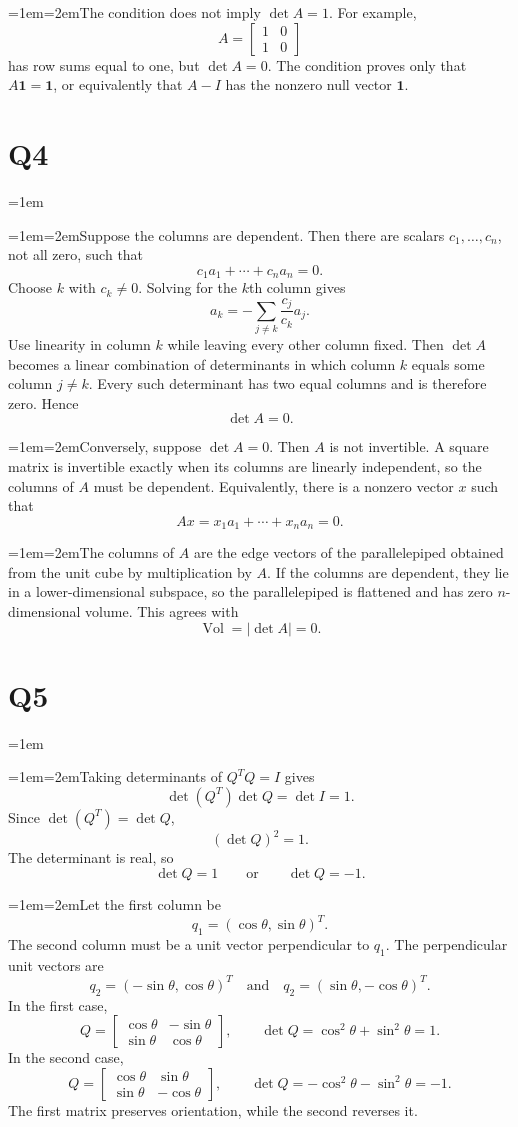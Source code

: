 \documentclass[11pt]{article}
\newcommand{\solutionquestion}[1]{\par\leftskip=0pt\section*{Q#1}\leftskip=1em}
\newcommand{\solutionpart}[1]{\par\smallskip\leftskip=1em\noindent\hangindent=2em\hangafter=1\makebox[1.5em][l]{\textbf{(#1)}}\hspace{0.5em}\ignorespaces}
\begin{document}
\solutionpart{iii}The condition does not imply $\det A=1$. For example,
\[
A=\begin{bmatrix}1&0\\1&0\end{bmatrix}
\]
has row sums equal to one, but $\det A=0$. The condition proves only that $A\boldsymbol{1}=\boldsymbol{1}$, or equivalently that $A-I$ has the nonzero null vector $\boldsymbol{1}$.

\solutionquestion{4}
\solutionpart{i}Suppose the columns are dependent. Then there are scalars $c_1,\ldots,c_n$, not all zero, such that
\[
c_1a_1+\cdots+c_n a_n=0.
\]
Choose $k$ with $c_k\ne0$. Solving for the $k$th column gives
\[
a_k=-\sum_{j\ne k}\frac{c_j}{c_k}a_j.
\]
Use linearity in column $k$ while leaving every other column fixed. Then $\det A$ becomes a linear combination of determinants in which column $k$ equals some column $j\ne k$. Every such determinant has two equal columns and is therefore zero. Hence
\[
\det A=0.
\]

\solutionpart{ii}Conversely, suppose $\det A=0$. Then $A$ is not invertible. A square matrix is invertible exactly when its columns are linearly independent, so the columns of $A$ must be dependent. Equivalently, there is a nonzero vector $x$ such that
\[
Ax=x_1a_1+\cdots+x_n a_n=0.
\]

\solutionpart{iii}The columns of $A$ are the edge vectors of the parallelepiped obtained from the unit cube by multiplication by $A$. If the columns are dependent, they lie in a lower-dimensional subspace, so the parallelepiped is flattened and has zero $n$-dimensional volume. This agrees with
\[
\operatorname{Vol}=|\det A|=0.
\]

\solutionquestion{5}
\solutionpart{i}Taking determinants of ${Q}^{T}Q=I$ gives
\[
\det({Q}^{T})\det Q=\det I=1.
\]
Since $\det({Q}^{T})=\det Q$,
\[
{(\det Q)}^2=1.
\]
The determinant is real, so
\[
\det Q=1\qquad\text{or}\qquad\det Q=-1.
\]

\solutionpart{ii}Let the first column be
\[
q_1={ (\cos\theta,\sin\theta) }^{T}.
\]
The second column must be a unit vector perpendicular to $q_1$. The perpendicular unit vectors are
\[
q_2={ (-\sin\theta,\cos\theta) }^{T}
\quad\text{and}\quad
q_2={ (\sin\theta,-\cos\theta) }^{T}.
\]
In the first case,
\[
Q=\begin{bmatrix}\cos\theta&-\sin\theta\\\sin\theta&\cos\theta\end{bmatrix},
\qquad
\det Q=\cos^2\theta+\sin^2\theta=1.
\]
In the second case,
\[
Q=\begin{bmatrix}\cos\theta&\sin\theta\\\sin\theta&-\cos\theta\end{bmatrix},
\qquad
\det Q=-\cos^2\theta-\sin^2\theta=-1.
\]
The first matrix preserves orientation, while the second reverses it.
\end{document}
